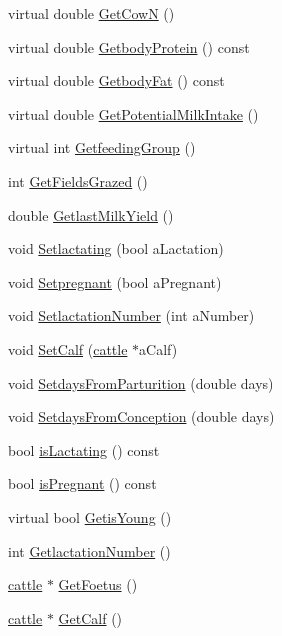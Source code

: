 \begin{DoxyCompactItemize}
\item 
virtual double \hyperlink{classcattle_a8603e5213d0e6f8fecf19151c391d682}{GetCowN} ()
\item 
virtual double \hyperlink{classcattle_ae19ec8afe91d65ef9b60eecc36acbffd}{GetbodyProtein} () const 
\item 
virtual double \hyperlink{classcattle_a0ef7cd4d80ad3abf2d95f792d7d84ea4}{GetbodyFat} () const 
\item 
virtual double \hyperlink{classcattle_aee7aea077f7f8fd48035eae6308bdabc}{GetPotentialMilkIntake} ()
\item 
virtual int \hyperlink{classcattle_a2f1b1ea50c4b0bd9aaea20a3f715645a}{GetfeedingGroup} ()
\item 
int \hyperlink{classcattle_a3166b570f41005f2806018d06d04bd0b}{GetFieldsGrazed} ()
\item 
double \hyperlink{classcattle_a8211a2fdbecf994a39ab695be7a2bfb0}{GetlastMilkYield} ()
\item 
void \hyperlink{classcattle_aec62f7edf9677935504583181c378966}{Setlactating} (bool aLactation)
\item 
void \hyperlink{classcattle_ad253d77a1a672d0ebc2b4e7093aad228}{Setpregnant} (bool aPregnant)
\item 
void \hyperlink{classcattle_aeed22677fe5975db88ee1788b5d27670}{SetlactationNumber} (int aNumber)
\item 
void \hyperlink{classcattle_a41da605e6ff1f29060cd6b67899946f1}{SetCalf} (\hyperlink{classcattle}{cattle} $\ast$aCalf)
\item 
void \hyperlink{classcattle_ac2b8f179d21f9b6e11f803e68a43f607}{SetdaysFromParturition} (double days)
\item 
void \hyperlink{classcattle_a914dbca3cb615490a696d4a63aaab37a}{SetdaysFromConception} (double days)
\item 
bool \hyperlink{classcattle_a45e30956734fd3fba35da661cf4198e2}{isLactating} () const 
\item 
bool \hyperlink{classcattle_abbe4b4f1b07cee30b41122bcad34ea48}{isPregnant} () const 
\item 
virtual bool \hyperlink{classcattle_a059b9c483e37fa36a43773026d07fd92}{GetisYoung} ()
\item 
int \hyperlink{classcattle_a4fef6fdeb96e7a68e7e351c638f8fa13}{GetlactationNumber} ()
\item 
\hyperlink{classcattle}{cattle} $\ast$ \hyperlink{classcattle_ac37916ffd8ad3a51956838cf35a51e94}{GetFoetus} ()
\item 
\hyperlink{classcattle}{cattle} $\ast$ \hyperlink{classcattle_a0db754787fa065708f8d1d54afa51883}{GetCalf} ()

\end{DoxyCompactItemize}
